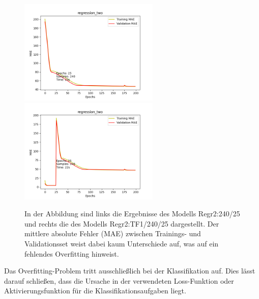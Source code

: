 \begin{figure}[htpb]
    \includegraphics[height=5cm]{../../Plots/ba_plots/regr2/woregr2tr.png}
    \includegraphics[height=5cm]{../../Plots/ba_plots/regr2/1TFtr.png}
    \caption{\label{fig:regr2tf} 
    \small{In der Abbildung sind links die Ergebnisse des Modells Regr2:240/25 und rechts die des Modells Regr2:TF1/240/25 dargestellt. Der 
    mittlere absolute Fehler (MAE) zwischen Trainings- und Validationsset weist dabei kaum Unterschiede auf, was auf ein fehlendes Overfitting 
    hinweist.}}
\end{figure}

Das Overfitting-Problem tritt ausschließlich bei der Klassifikation auf. Dies lässt darauf schließen, dass die Ursache in der verwendeten 
Loss-Funktion oder Aktivierungsfunktion für die Klassifikationsaufgaben liegt.
